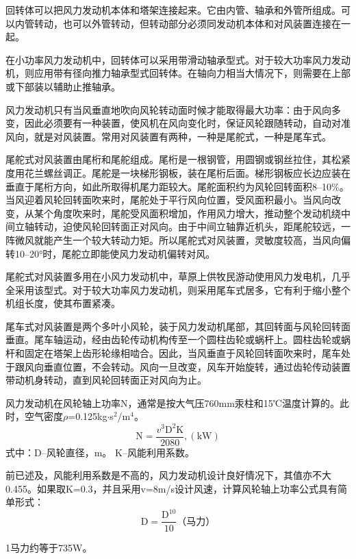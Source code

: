 \documentclass{ctexbook}
\begin{document}
回转体可以把风力发动机本体和塔架连接起来。它由内管、轴承和外管所组成。可以内管转动，也可以外管转动，但转动部分必须同发动机本体和对风装置连接在一起。

在小功率风力发动机中，回转体可以采用带滑动轴承型式。对于较大功率风力发动机，则应用带有径向推力轴承型式回转体。在轴向力相当大情况下，则需要在上部或下部装以辅助止推轴承。

风力发动机只有当风垂直地吹向风轮转动面时候才能取得最大功率：由于风向多变，因此必须要有一种装置，使风机在风向变化时，保证风轮跟随转动，自动对准风向，就是对风装置。常用对风装置有两种，一种是尾舵式，一种是尾车式。

尾舵式对风装置由尾桁和尾舵组成。尾桁是一根钢管，用圆钢或钢丝拉住，其松紧度用花兰螺丝调正。尾舵是一块梯形钢板，装在尾桁后面。梯形钢板应长边应装在垂直于尾桁方向，如此所取得机尾力距较大。尾舵面积约为风轮回转面积8--10\%。当风迎着风轮回转面吹来时，尾舵处于平行风向位置，受风面积最小。当风向改变，从某个角度吹来时，尾舵受风面积增加，作用风力增大，推动整个发动机绕中间立轴转动，迫使风轮回转面正对风向。由于中间立轴靠近机头，距尾舵较远，一阵微风就能产生一个较大转动力矩。所以尾舵式对风装置，灵敏度较高，当风向偏转10--20°时，尾舵立即能使风力发动机偏转对风。

尾舵式对风装置多用在小风力发动机中，草原上供牧民游动使用风力发电机，几乎全采用该型式。对于较大功率风力发动机，则采用尾车式居多，它有利于缩小整个机组长度，使其布置紧凑。

尾车式对风装置是两个多叶小风轮，装于风力发动机尾部，其回转面与风轮回转面垂直。尾车轴运动，经由齿轮传动机构传至一个圆柱齿轮或蜗杆上。圆柱齿轮或蜗杆和固定在塔架上齿形轮缘相啮合。因此，当风垂直于风轮回转面吹来时，尾车处于跟风向垂直位置，不会转动。风向一旦改变，风车开始旋转，通过齿轮传动装置带动机身转动，直到风轮回转面正对风向为止。

风力发动机在风轮轴上功率N，通常是按大气压760mm汞柱和15℃温度计算的。此时，空气密度$\rho$=0.125kg$\cdot$s$^{2}$/m$^4$。
\begin{equation*}
	\text{N}=\frac{v^{3}\text{D}^{2}\text{K}}{2080} , (\text{kW})
\end{equation*}
式中：D--风轮直径，m。
K--风能利用系数。

前已述及，风能利用系数是不高的，风力发动机设计良好情况下，其值亦不大0.455。如果取K=0.3，并且采用v=8m/s设计风速，计算风轮轴上功率公式具有简单形式：
\begin{equation*}
	\text{D}=\frac{\text{D}^{10}}{10} \text{（马力）}
\end{equation*}

1马力约等于735W。
\end{document}
